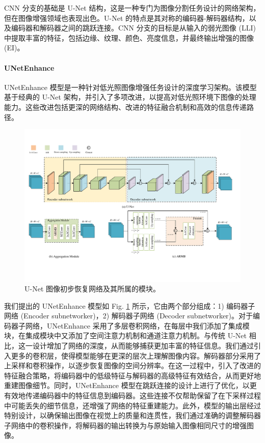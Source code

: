 \documentclass[a4paper, 10pt]{article}
\begin{document}
		CNN 分支的基础是 U-Net 结构，这是一种专门为图像分割任务设计的网络架构，但在图像增强领域也表现出色。U-Net 的特点是其对称的编码器-解码器结构，以及编码器和解码器之间的跳跃连接。CNN 分支的目标是从输入的弱光图像 (LLI) 中提取丰富的特征，包括边缘、纹理、颜色、亮度信息，并最终输出增强的图像 (EI)。
		
		\paragraph{UNetEnhance}
		
		UNetEnhance 模型是一种针对低光照图像增强任务设计的深度学习架构。该模型基于经典的 U-Net 架构，并引入了多项改进，以提高对低光照环境下图像的处理能力。这些改进包括更深的网络结构、改进的特征融合机制和高效的信息传递路径。
		
		\begin{figure}[htb]
			\centering 
			\includegraphics[width=\columnwidth]{picture/LLIE/My Architecture/U-Net and AM}
			\caption{
				\label{fig: U-Net and AM} 
				U-Net 图像初步恢复网络及其所属的模块。
			}
		\end{figure}
		
		我们提出的 UNetEnhance 模型如 Fig. \ref{fig: U-Net and AM} 所示，它由两个部分组成：1) 编码器子网络 (Encoder subnetworker)，2) 解码器子网络 (Decoder subnetworker)。对于编码器子网络，UNetEnhance 采用了多层卷积网络，在每层中我们添加了集成模块，在集成模块中又添加了空间注意力机制和通道注意力机制\cite{woo2018cbam}。与传统 U-Net 相比，这一设计增加了网络的深度，从而能够捕获更加丰富的特征信息。我们通过引入更多的卷积层，使得模型能够在更深的层次上理解图像内容。解码器部分采用了上采样和卷积操作，以逐步恢复图像的空间分辨率。在这一过程中，引入了改进的特征融合策略，将编码器中的低级特征与解码器的高级特征有效结合，从而更好地重建图像细节。同时，UNetEnhance 模型在跳跃连接的设计上进行了优化，以更有效地传递编码器中的特征信息到编码器。这些连接不仅帮助保留了在下采样过程中可能丢失的细节信息，还增强了网络的特征重建能力。此外，模型的输出层经过特别设计，以确保输出图像在视觉上的质量和连贯性，我们通过准确的调整解码器子网络中的卷积操作，将解码器的输出转换为与原始输入图像相同尺寸的增强图像。
		
\end{document}
